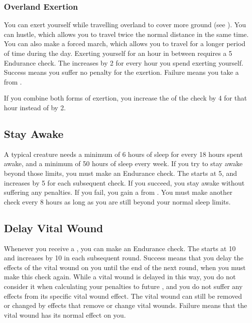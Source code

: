     \subsubsection{Overland Exertion}\label{Overland Exertion}
        You can exert yourself while travelling overland to cover more ground (see ).
        You can hustle, which allows you to travel twice the normal distance in the same time.
        You can also make a forced march, which allows you to travel for a longer period of time during the day.
        Exerting yourself for an hour in between  requires a  5 Endurance check.
        The  increases by 2 for every hour you spend exerting yourself.
        Success means you suffer no penalty for the exertion.
        Failure means you take a  from .

        If you combine both forms of exertion, you increase the  of the check by 4 for that hour instead of by 2.

    \subsection{Stay Awake}\label{Stay Awake}
        A typical creature needs a minimum of 6 hours of sleep for every 18 hours spent awake, and a minimum of 50 hours of sleep every week.
        If you try to stay awake beyond those limits, you must make an Endurance check.
        The  starts at 5, and increases by 5 for each subsequent check.
        If you succeed, you stay awake without suffering any penalties.
        If you fail, you gain a  from .
        You must make another check every 8 hours as long as you are still beyond your normal sleep limits.

    \subsection{Delay Vital Wound}\label{Delay Vital Wound}
        Whenever you receive a , you can make an Endurance check.
        The  starts at 10 and increases by 10 in each subsequent round.
        Success means that you delay the effects of the vital wound on you until the end of the next round, when you must make this check again.
        While a vital wound is delayed in this way, you do not consider it when calculating your penalties to future , and you do not suffer any effects from its specific vital wound effect.
        The vital wound can still be removed or changed by effects that remove or change vital wounds.
        Failure means that the vital wound has its normal effect on you.

